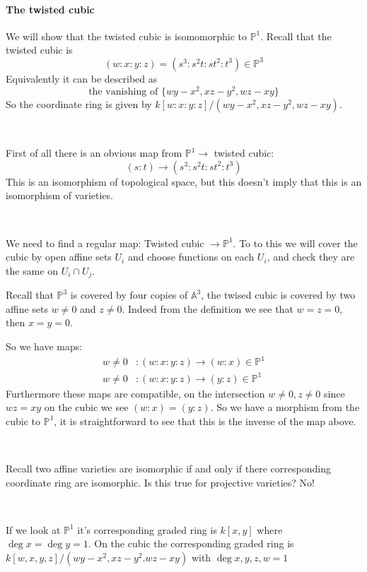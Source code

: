 \paragraph*{The twisted cubic}

We will show that the twisted cubic is isomomorphic to $\mathbb{P}^1$. Recall that the twisted cubic is \[(w\colon x\colon y\colon z) = (s^3\colon s^2t\colon st^2\colon t^3)\in \mathbb{P}^3\]
Equivalently it can be described as\[\text{the vanishing of }\{wy-x^2, xz-y^2, wz-xy\}\]
So the coordinate ring is given by $k[w\colon x\colon y\colon z]/(wy-x^2, xz-y^2, wz-xy)$.

\

First of all there is an obvious map from $\mathbb{P}^1\rightarrow $ twisted cubic:\[(s\colon t)\rightarrow (s^3\colon s^2t\colon st^2\colon t^3)\]
This is an isomorphism of topological space, but this doesn't imply that this is an isomorphism of varieties.

\

We need to find a regular map: Twisted cubic $\rightarrow \mathbb{P}^1$. To to this we will cover the cubic by open affine sets $U_i$ and choose functions on each $U_i$, and check they are the same on $U_i\cap U_j$. 


Recall that $\mathbb{P}^3$ is covered by four copies of $\mathbb{A}^3$, the twised cubic is covered by two affine sets $w\neq 0$ and $z\neq 0$. Indeed from the definition we see that $w=z=0$, then $x=y=0$.

So we have maps: \begin{align*}
    w\neq 0&\colon (w\colon x\colon y\colon z)\rightarrow (w\colon x)\in \mathbb{P}^1\\
    w\neq 0&\colon (w\colon x\colon y\colon z)\rightarrow (y\colon z)\in \mathbb{P}^1
\end{align*}
Furthermore these maps are compatible, on the intersection $w\neq 0, z\neq 0$ since $wz=xy$ on the cubic we see $(w\colon x) = (y\colon z)$. So we have a morphism from the cubic to $\mathbb{P}^1$, it is straightforward to see that this is the inverse of the map above.

\

Recall two affine varieties are isomorphic if and only if there corresponding coordinate ring are isomorphic. Is this true for projective varieties? No!

\

If we look at $\mathbb{P}^1$ it's corresponding graded ring is $k[x, y]$ where $\deg x = \deg y = 1$. On the cubic the corresponding graded ring is $k[w,x,y,z]/(wy-x^2, xz-y^2.wz-xy)$ with $\deg x,y,z,w = 1$

